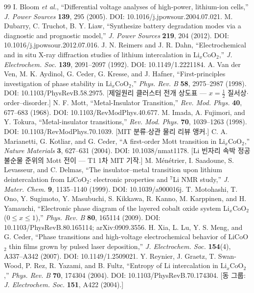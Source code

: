\begin{thebibliography}{99}
 I. Bloom \emph{et al.}, ``Differential voltage analyses of high-power, lithium-ion cells,'' \emph{J. Power Sources} \textbf{139}, 295 (2005). DOI: 10.1016/j.jpowsour.2004.07.021.
 M. Dubarry, C. Truchot, B. Y. Liaw, ``Synthesize battery degradation modes via a diagnostic and prognostic model,'' \emph{J. Power Sources} \textbf{219}, 204 (2012). DOI: 10.1016/j.jpowsour.2012.07.016.
 J. N. Reimers and J. R. Dahn, ``Electrochemical and in situ X-ray diffraction studies of lithium intercalation in Li$_x$CoO$_2$,'' \emph{J. Electrochem. Soc.} \textbf{139}, 2091--2097 (1992). DOI: 10.1149/1.2221184.
 A. Van der Ven, M. K. Aydinol, G. Ceder, G. Kresse, and J. Hafner, ``First-principles investigation of phase stability in Li$_x$CoO$_2$,'' \emph{Phys. Rev. B} \textbf{58}, 2975--2987 (1998). DOI: 10.1103/PhysRevB.58.2975. [제일원리 클러스터 전개 상도표 --- $x{=}\tfrac12$ 질서상$\cdot$order--disorder.]
 N. F. Mott, ``Metal-Insulator Transition,'' \emph{Rev. Mod. Phys.} \textbf{40}, 677--683 (1968). DOI: 10.1103/RevModPhys.40.677.
 M. Imada, A. Fujimori, and Y. Tokura, ``Metal-insulator transitions,'' \emph{Rev. Mod. Phys.} \textbf{70}, 1039--1263 (1998). DOI: 10.1103/RevModPhys.70.1039. [MIT 분류$\cdot$상관 물리 리뷰 앵커.]
 C. A. Marianetti, G. Kotliar, and G. Ceder, ``A first-order Mott transition in Li$_x$CoO$_2$,'' \emph{Nature Materials} \textbf{3}, 627--631 (2004). DOI: 10.1038/nmat1178. [Li 빈자리 속박 정공 불순물 준위의 Mott 전이 --- T1 1차 MIT 기작.]
 M. M\'en\'etrier, I. Saadoune, S. Levasseur, and C. Delmas, ``The insulator--metal transition upon lithium deintercalation from LiCoO$_2$: electronic properties and $^7$Li NMR study,'' \emph{J. Mater. Chem.} \textbf{9}, 1135--1140 (1999). DOI: 10.1039/a900016j.
 T. Motohashi, T. Ono, Y. Sugimoto, Y. Masubuchi, S. Kikkawa, R. Kanno, M. Karppinen, and H. Yamauchi, ``Electronic phase diagram of the layered cobalt oxide system Li$_x$CoO$_2$ ($0\le x\le1$),'' \emph{Phys. Rev. B} \textbf{80}, 165114 (2009). DOI: 10.1103/PhysRevB.80.165114; arXiv:0909.3556.
 H. Xia, L. Lu, Y. S. Meng, and G. Ceder, ``Phase transitions and high-voltage electrochemical behavior of LiCoO$_2$ thin films grown by pulsed laser deposition,'' \emph{J. Electrochem. Soc.} \textbf{154}(4), A337--A342 (2007). DOI: 10.1149/1.2509021.
 Y. Reynier, J. Graetz, T. Swan-Wood, P. Rez, R. Yazami, and B. Fultz, ``Entropy of Li intercalation in Li$_x$CoO$_2$,'' \emph{Phys. Rev. B} \textbf{70}, 174304 (2004). DOI: 10.1103/PhysRevB.70.174304. [동 그룹: \emph{J. Electrochem. Soc.} \textbf{151}, A422 (2004).]

\end{thebibliography}
